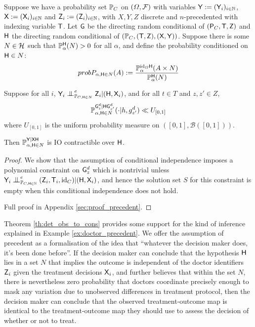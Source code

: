 \begin{theorem}\label{th:det_obs_to_cons}
Suppose we have a probability set $\mathbb{P}_C$ on $(\Omega,\mathcal{F})$ with variables $\mathsf{Y}:=(\mathsf{Y}_i)_{i\in \mathbb{N}}$, $\mathsf{X}:=(\mathsf{X}_i)_{i\in \mathbb{N}}$ and $\mathsf{Z}_i:= (\mathsf{Z}_i)_{i\in \mathbb{N}}$, with $X,Y,Z$ discrete and $n$-precedented with indexing variable $\mathsf{T}$. Let $\mathsf{G}$ be the directing random conditional of $(\mathsf{P}_C,\mathsf{T},\mathsf{Z})$ and $\mathsf{H}$ the directing random conditional of $(\mathbb{P}_C,(\mathsf{T},\mathsf{Z}),(\mathsf{X},\mathsf{Y}))$. Suppose there is some $N\in\mathcal{H}$ such that $\mathbb{P}_\alpha^{\mathsf{H}}(N)>0$ for all $\alpha$, and define the probability conditioned on $\mathsf{H}\in N$:
\begin{align}
prob{P}_{\alpha,\mathsf{H}\in N} (A):= \frac{\mathbb{P}_\alpha^{\text{id}_\Omega \mathsf{H}}(A\times N)}{\mathbb{P}_\alpha^{\mathsf{H}}(N)}
\end{align}

Suppose for all $i$, $\RV{Y}_i\CI^e_{\prob{P}_{C,\RV{H}\in N}} \RV{Z}_i|(\RV{H},\RV{X}_i)$, and for all $t\in T$ and $z,z'\in Z$,
\begin{align}
    \mathbb{P}_{\alpha,\mathsf{H}\in N}^{\mathsf{G}^d_{z}|\mathsf{H}\mathsf{G}^d_{z'}}(\cdot|h,g^d_{z'}) \ll U_{[0,1]}\label{eq:lebesgue_dom}
\end{align}
where $U_{[0,1]}$ is the uniform probability measure on $([0,1],\mathcal{B}([0,1]))$.

Then $\mathbb{P}_{\alpha,\mathsf{H}\in N}^{\mathsf{Y}|\mathsf{X}\mathsf{H}}$ is IO contractible over $\mathsf{H}$.
\end{theorem}

\begin{proof}
We show that the assumption of conditional independence imposes a polynomial constraint on $\mathsf{G}^d_z$ which is nontrivial unless $\RV{Y}_i\CI^e_{\prob{P}_{C,\RV{H}\in\mathbb{N}}} (\RV{Z}_i,\RV{T}_i,\text{id}_C)|(\RV{H},\RV{X}_i)$, and hence the solution set $S$ for this constraint is empty when this conditional independence does not hold.

Full proof in Appendix \ref{sec:proof_precedent}.
\end{proof}

Theorem \ref{th:det_obs_to_cons} provides some support for the kind of inference explained in Example \ref{ex:doctor_precedent}. We offer the assumption of precedent as a formalisation of the idea that ``whatever the decision maker does, it's been done before''. If the decision maker can conclude that the hypothesis $\mathsf{H}$ lies in a set $N$ that implies the outcome is independent of the doctor identifiers $\mathsf{Z}_i$ given the treatment decisions $\mathsf{X}_i$, and further believes that within the set $N$, there is nevertheless zero probability that doctors coordinate precisely enough to mask any variation due to unobserved differences in treatment protocol, then the decision maker can conclude that the observed treatment-outcome map is identical to the treatment-outcome map they should use to assess the decision of whether or not to treat.

